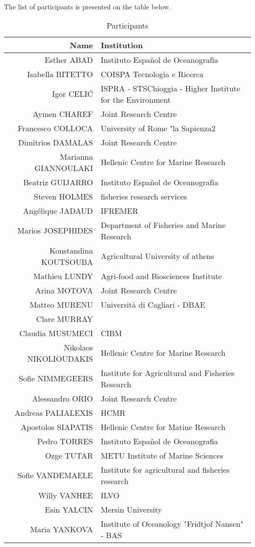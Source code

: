 \documentclass[a4paper]{article}
\begin{document}
The list of participants is presented on the table below.

\begin{table}[H]
\begin{tabular}{rl}
\hline 
Name & Institution \\
\hline 
\hline 
Esther ABAD & Instituto Español de Oceanografía \\
Isabella BITETTO & COISPA Tecnologia e Ricerca \\
Igor CELIĆ & ISPRA - STSChioggia - Higher Institute for the Environment \\
Aymen CHAREF & Joint Research Centre \\
Francesco COLLOCA & University of Rome "la Sapienza2 \\
Dimitrios DAMALAS & Joint Research Centre \\
Marianna GIANNOULAKI & Hellenic Centre for Marine Research \\
Beatriz GUIJARRO & Instituto Español de Oceanografía \\
Steven HOLMES & fisheries research services \\
Angélique JADAUD & IFREMER \\
Marios JOSEPHIDES & Department of Fisheries and Marine Research \\
Konstandina KOUTSOUBA & Agricultural University of athens \\
Mathieu LUNDY & Agri-food and Biosciences Institute \\
Arina MOTOVA & Joint Research Centre \\
Matteo MURENU & Università di Cagliari - DBAE \\
Clare MURRAY &  \\
Claudia MUSUMECI & CIBM \\
Nikolaos NIKOLIOUDAKIS & Hellenic Centre for Marine Research \\
Sofie NIMMEGEERS & Institute for Agricultural and Fisheries Research \\ 
Alessandro ORIO & Joint Research Centre \\
Andreas PALIALEXIS & HCMR \\
Apostolos SIAPATIS & Hellenic Centre for Matine Research \\
Pedro TORRES & Instituto Español de Oceanografia \\
Ozge TUTAR & METU Institute of Marine Sciences \\
Sofie VANDEMAELE & Institute for agricultural and fisheries research \\
Willy VANHEE & ILVO \\
Esin YALCIN & Mersin University \\
Maria YANKOVA & Institute of Oceanology "Fridtjof Nansen" - BAS \\
\hline 
\end{tabular}
\caption{Participants}
\end{table}
\end{document}
